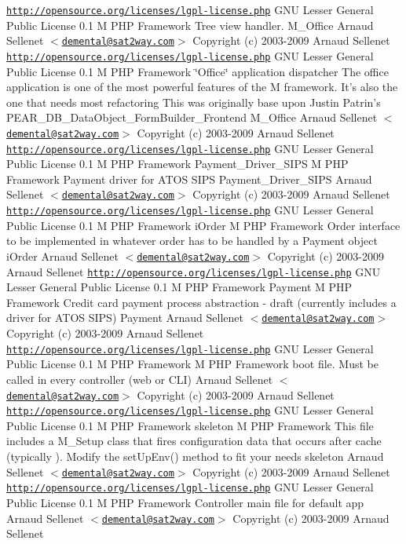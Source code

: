 \begin{Desc}
\href{http://opensource.org/licenses/lgpl-license.php}{\tt http://opensource.org/licenses/lgpl-license.php} GNU Lesser General Public License  0.1  M PHP Framework  Tree view handler.   M\_\-Office  Arnaud Sellenet $<$\href{mailto:demental@sat2way.com}{\tt demental@sat2way.com}$>$  Copyright (c) 2003-2009 Arnaud Sellenet  \href{http://opensource.org/licenses/lgpl-license.php}{\tt http://opensource.org/licenses/lgpl-license.php} GNU Lesser General Public License  0.1  M PHP Framework  \char`\"{}Office\char`\"{} application dispatcher The office application is one of the most powerful features of the M framework. It's also the one that needs most refactoring This was originally base upon Justin Patrin's PEAR\_\-DB\_\-DataObject\_\-FormBuilder\_\-Frontend   M\_\-Office  Arnaud Sellenet $<$\href{mailto:demental@sat2way.com}{\tt demental@sat2way.com}$>$  Copyright (c) 2003-2009 Arnaud Sellenet  \href{http://opensource.org/licenses/lgpl-license.php}{\tt http://opensource.org/licenses/lgpl-license.php} GNU Lesser General Public License  0.1  M PHP Framework   Payment\_\-Driver\_\-SIPS  M PHP Framework  Payment driver for ATOS SIPS   Payment\_\-Driver\_\-SIPS  Arnaud Sellenet $<$\href{mailto:demental@sat2way.com}{\tt demental@sat2way.com}$>$  Copyright (c) 2003-2009 Arnaud Sellenet  \href{http://opensource.org/licenses/lgpl-license.php}{\tt http://opensource.org/licenses/lgpl-license.php} GNU Lesser General Public License  0.1  M PHP Framework   iOrder  M PHP Framework  Order interface to be implemented in whatever order has to be handled by a Payment object   iOrder  Arnaud Sellenet $<$\href{mailto:demental@sat2way.com}{\tt demental@sat2way.com}$>$  Copyright (c) 2003-2009 Arnaud Sellenet  \href{http://opensource.org/licenses/lgpl-license.php}{\tt http://opensource.org/licenses/lgpl-license.php} GNU Lesser General Public License  0.1  M PHP Framework   Payment  M PHP Framework  Credit card payment process abstraction - draft (currently includes a driver for ATOS SIPS)   Payment  Arnaud Sellenet $<$\href{mailto:demental@sat2way.com}{\tt demental@sat2way.com}$>$  Copyright (c) 2003-2009 Arnaud Sellenet  \href{http://opensource.org/licenses/lgpl-license.php}{\tt http://opensource.org/licenses/lgpl-license.php} GNU Lesser General Public License  0.1  M PHP Framework  M PHP Framework  boot file. Must be called in every controller (web or CLI)   Arnaud Sellenet $<$\href{mailto:demental@sat2way.com}{\tt demental@sat2way.com}$>$  Copyright (c) 2003-2009 Arnaud Sellenet  \href{http://opensource.org/licenses/lgpl-license.php}{\tt http://opensource.org/licenses/lgpl-license.php} GNU Lesser General Public License  0.1  M PHP Framework   skeleton  M PHP Framework  This file includes a M\_\-Setup class that fires configuration data that occurs after cache (typically ). Modify the setUpEnv() method to fit your needs   skeleton  Arnaud Sellenet $<$\href{mailto:demental@sat2way.com}{\tt demental@sat2way.com}$>$  Copyright (c) 2003-2009 Arnaud Sellenet  \href{http://opensource.org/licenses/lgpl-license.php}{\tt http://opensource.org/licenses/lgpl-license.php} GNU Lesser General Public License  0.1  M PHP Framework  Controller main file for default app   Arnaud Sellenet $<$\href{mailto:demental@sat2way.com}{\tt demental@sat2way.com}$>$  Copyright (c) 2003-2009 Arnaud Sellenet  
\end{Desc}
